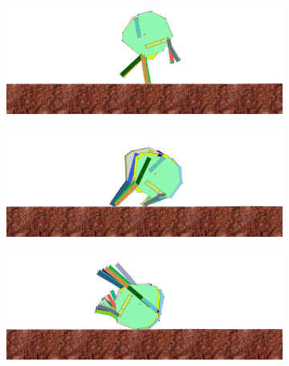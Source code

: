             \begin{figure}[H]
              \centering
              \begin{subfigure}[b]{0.45\textwidth}
                \includegraphics[width=\linewidth,center]{graphics/simulation-results/4_gen200_1}
                \caption{\label{fig:gen200_1}}
              \end{subfigure}
              \begin{subfigure}[b]{0.45\textwidth}
                \includegraphics[width=\linewidth,center]{graphics/simulation-results/4_gen200_2}
                \caption{\label{fig:gen200_2}}
              \end{subfigure}
              \begin{subfigure}[b]{0.45\textwidth}
                \includegraphics[width=\linewidth,center]{graphics/simulation-results/4_gen200_3}
                \caption{\label{fig:gen200_3}}
              \end{subfigure}
              \begin{subfigure}[b]{0.45\textwidth}

\end{subfigure}
\end{figure}
